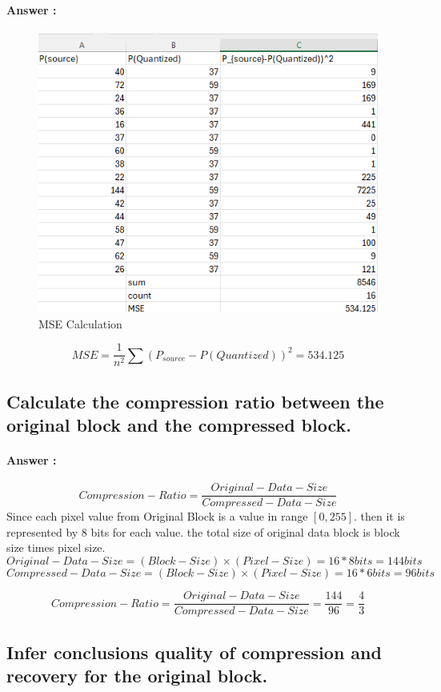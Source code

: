 \documentclass[letterpaper, 12pt]{article}
\begin{document}
\paragraph{Answer : }
\begin{figure}[htbp]
    \centering
    \includegraphics[width=0.75\linewidth]{FINAL_ASSIGNMENT/I_S_5.png}
    \caption{MSE Calculation}
    \label{fig:enter-label}
\end{figure}
\[MSE = \frac{1}{n^2}\sum(P_{source}-P(Quantized))^2 = 534.125\]

\subsection{Calculate the compression ratio between the original block and the compressed block.}
\paragraph{Answer :}
\[Compression-Ratio = \frac{Original-Data-Size}{Compressed-Data-Size}\]
Since each pixel value from Original Block is a value in range $[0,255]$. then it is represented by 8 bits for each value. the total size of original data block is block size times pixel size.
\[Original-Data-Size = (Block-Size) \times (Pixel-Size) = 16 * 8 bits = 144bits \]
\[Compressed-Data-Size = (Block-Size) \times (Pixel-Size) = 16 * 6 bits = 96bits \]

\[Compression-Ratio = \frac{Original-Data-Size}{Compressed-Data-Size} = \frac{144}{96} = \frac{4}{3}\]

\subsection{Infer conclusions quality of compression and recovery for the original block.}
\end{document}
